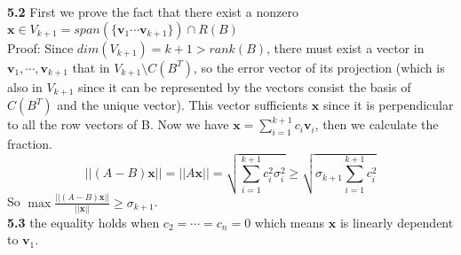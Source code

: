\documentclass{article}
\begin{document}
\textbf{5.2} First we prove the fact that there exist a nonzero $\mathbf{x}\in V_{k+1}=span(\{\mathbf{v}_1\cdots\mathbf{v}_{k+1}\}) \cap R(B)$\\
Proof: Since $dim(V_{k+1})=k+1>rank(B)$, there must exist a vector in $\mathbf{v}_1,\cdots, \mathbf{v}_{k+1}$ that in $V_{k+1}\setminus C(B^T)$, so the error vector of its projection (which is also in $V_{k+1}$ since it can be represented by the vectors consist the basis of $C(B^T)$ and the unique vector).
 This vector sufficients $\mathbf{x}$ since it is perpendicular to all the row vectors of B.
Now we have $\mathbf{x}=\sum_{i =1}^{k+1}c_i\mathbf{v}_i$, then we calculate the fraction.
\[
||(A-B)\mathbf{x}||=||A\mathbf{x}||=\sqrt{\sum_{i=1}^{k+1}c_i^2\sigma_i^2}\geq\sqrt{\sigma_{k+1}\sum_{i=1}^{k+1}c_i^2}
\]
So $\max \frac{||(A-B)\mathbf{x}||}{||\mathbf{x}||}\geq \sigma_{k+1}$.\\

\textbf{5.3} the equality holds when $c_2=\cdots=c_n=0$ which means $\mathbf{x}$ is linearly dependent to $\mathbf{v}_1$.
\end{document}
